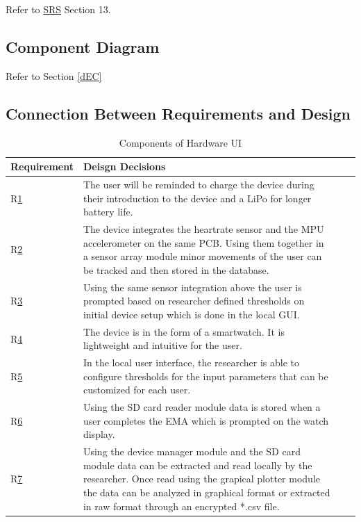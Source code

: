 \documentclass[12pt, titlepage]{article}
\begin{document}
Refer to \href{https://github.com/zakerl/Capstone_Project/blob/main/docs/SRS/SRS.pdf}{SRS} Section 13.

\subsection{Component Diagram}

Refer to Section \ref{dEC}

\subsection{Connection Between Requirements and Design} \label{SecConnection}

\begin{table}[H]
	\begin{tabularx}{1.05\textwidth} { 
		  | >{\centering\arraybackslash}X 
		  | >{\centering\arraybackslash}X 
		  | >{\centering\arraybackslash}X 
		  | >{\centering\arraybackslash}X | }
		 \hline
		 \textbf{Requirement} & \textbf{Deisgn Decisions} \\
		\hline
		R\href{https://github.com/zakerl/Capstone_Project/blob/main/docs/SRS/SRS.pdf}{1}  & The user will be reminded to charge the device during their introduction to the device and a LiPo for longer battery life. \\		 
		\hline
		R\href{https://github.com/zakerl/Capstone_Project/blob/main/docs/SRS/SRS.pdf}{2} & The device integrates the heartrate sensor and the MPU accelerometer on the same PCB. Using them together in a sensor array module minor movements of the user can be tracked and then stored in the database. \\
		\hline
		 R\href{https://github.com/zakerl/Capstone_Project/blob/main/docs/SRS/SRS.pdf}{3} & Using the same sensor integration above the user is prompted based on researcher defined thresholds on initial device setup which is done in the local GUI. \\
		\hline
		R\href{https://github.com/zakerl/Capstone_Project/blob/main/docs/SRS/SRS.pdf}{4} & The device is in the form of a smartwatch. It is lightweight and intuitive for the user. \\
		\hline
		R\href{https://github.com/zakerl/Capstone_Project/blob/main/docs/SRS/SRS.pdf}{5} & In the local user interface, the researcher is able to configure thresholds for the input parameters that can be customized for each user. \\
		 \hline
		R\href{https://github.com/zakerl/Capstone_Project/blob/main/docs/SRS/SRS.pdf}{6}  & Using the SD card reader module data is stored when a user completes the EMA which is prompted on the watch display. \\
		\hline 
		 R\href{https://github.com/zakerl/Capstone_Project/blob/main/docs/SRS/SRS.pdf}{7}& Using the device manager module and the SD card module data can be extracted and read locally by the researcher. Once read using the grapical plotter module the data can be analyzed in graphical format or extracted in raw format through an encrypted *.csv file. \\
		\hline
	\end{tabularx}
\caption{\label{Hardware User Interface}Components of Hardware UI}  
\end{table}
\end{document}
